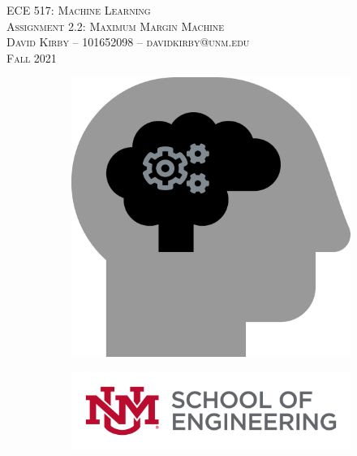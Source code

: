 \documentclass[11pt]{article}
\begin{document}
\setmainfont{SF Pro Text}
\setsansfont{SF Pro Text}
\setmonofont{SF Mono}
\renewcommand{\familydefault}{\sfdefault}


\thispagestyle{empty}
\begin{titlepage}
\vspace*{\fill}
\begin{center}
\textsc{\Huge{ECE 517: Machine Learning}}\\[3em]
\textsc{\LARGE Assignment 2.2: Maximum Margin Machine}\\[6em]
\textsc{\Large David Kirby -- 101652098 -- davidkirby@unm.edu}\\[3em]
\textsc{\Large Fall 2021}
\end{center}
\vfill
\begin{figure}[h]
\begin{subfigure}{0.5\textwidth}
\includegraphics[width=0.25\linewidth]{learning.png}
\end{subfigure}
\begin{subfigure}{0.6\textwidth}\hspace{1em}
\includegraphics[width=0.8\linewidth]{new-soe-logo.png}
\end{subfigure}
\end{figure}
\end{titlepage}
\setcounter{figure}{0}



\hypersetup{
    linkcolor=CrispBlue,
    urlcolor=CrispBlue,
    breaklinks=true
}
\end{document}
